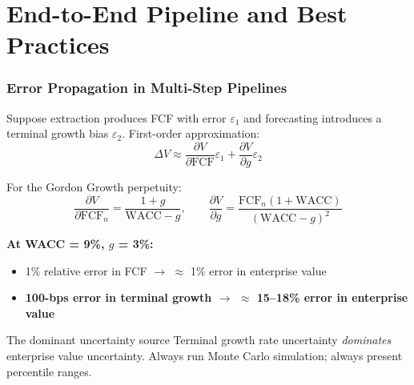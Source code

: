 \documentclass[9pt,t]{beamer}
\begin{document}
\section{End-to-End Pipeline and Best Practices}

\begin{frame}
\frametitle{Error Propagation in Multi-Step Pipelines}

Suppose extraction produces FCF with error $\varepsilon_1$ and forecasting introduces a terminal growth bias $\varepsilon_2$. First-order approximation:
\[
  \Delta V \approx \frac{\partial V}{\partial \text{FCF}} \varepsilon_1
                 + \frac{\partial V}{\partial g} \varepsilon_2
\]

For the Gordon Growth perpetuity:
\[
  \frac{\partial V}{\partial \text{FCF}_n} = \frac{1+g}{\text{WACC}-g}, \qquad
  \frac{\partial V}{\partial g} = \frac{\text{FCF}_n(1+\text{WACC})}{(\text{WACC}-g)^2}
\]

\medskip
\textbf{At WACC = 9\%, $g$ = 3\%:}
\begin{itemize}
  \item 1\% relative error in FCF $\to$ $\approx$ 1\% error in enterprise value
  \item \textbf{100-bps error in terminal growth $\to$ $\approx$ 15--18\% error in enterprise value}
\end{itemize}

\medskip
\begin{alertblock}{The dominant uncertainty source}
Terminal growth rate uncertainty \emph{dominates} enterprise value uncertainty.
Always run Monte Carlo simulation; always present percentile ranges.
\end{alertblock}
\end{frame}
\end{document}
